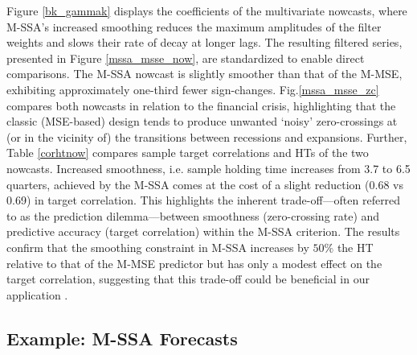 \documentclass[11pt,a4paper]{article}
\begin{document}
Figure \ref{bk_gammak} displays the coefficients of the multivariate nowcasts, where M-SSA's increased smoothing reduces the maximum amplitudes of the filter weights and slows their rate of decay at longer lags. The resulting filtered series, presented in Figure \ref{mssa_msse_now}, are standardized to enable direct comparisons. The M-SSA nowcast is slightly smoother than that of the M-MSE, exhibiting approximately one-third fewer sign-changes. Fig.\ref{mssa_msse_zc} compares both nowcasts in relation to the financial crisis, highlighting that the classic (MSE-based) design tends to produce unwanted `noisy' zero-crossings at (or in the vicinity of) the transitions between recessions and expansions. Further, Table \ref{corhtnow} compares sample target correlations and HTs of the two nowcasts. Increased smoothness, i.e. sample holding time increases from 3.7 to 6.5 quarters, achieved by the M-SSA comes at the cost of a slight reduction (0.68 vs 0.69) in target correlation. This highlights the inherent trade-off—often referred to as the prediction dilemma—between smoothness (zero-crossing rate) and predictive accuracy (target correlation) within the M-SSA criterion. 
The results confirm that the smoothing constraint in M-SSA
increases by $50\%$ the HT relative to that of the M-MSE predictor but has only a modest effect on the target correlation, suggesting that this trade-off could be beneficial in our application
. %


\subsection{Example: M-SSA Forecasts}
\end{document}
